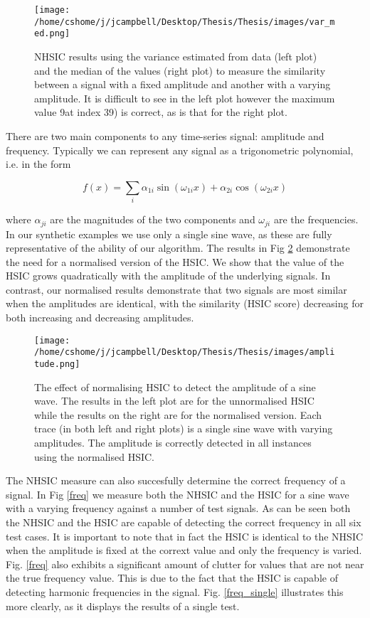 \begin{figure}[h]
\texttt{[image: /home/cshome/j/jcampbell/Desktop/Thesis/Thesis/images/var\_med.png]}
\caption{NHSIC results using the variance estimated from data (left plot) and the median of the values (right plot) to measure the similarity between a signal with a fixed amplitude and another with a varying amplitude. It is difficult to see in the left plot however the maximum value 9at index 39) is correct, as is that for the right plot.  \label{var_med}}
\end{figure}

There are two main components to any time-series signal: amplitude and frequency. Typically we can represent any signal as a trigonometric polynomial, i.e. in the form

\begin{equation}
f(x) = \sum_i{\alpha_{1i}\sin(\omega_{1i}x) + \alpha_{2i}\cos(\omega_{2i}x)}
\end{equation}

\noindent where $\alpha_{ji}$ are the magnitudes of the two components and $\omega_{ji}$ are the frequencies. In our synthetic examples we use only a single sine wave, as these are fully representative of the ability of our algorithm. The results in Fig \ref{amplitude} demonstrate the need for a normalised version of the HSIC. We show that the value of the HSIC grows quadratically with the amplitude of the underlying signals. In contrast, our normalised results demonstrate that two signals are most similar when the amplitudes are identical, with the similarity (HSIC score) decreasing for both increasing and decreasing amplitudes. \\

\begin{figure}[h!]
\texttt{[image: /home/cshome/j/jcampbell/Desktop/Thesis/Thesis/images/amplitude.png]}
\caption{The effect of normalising HSIC to detect the amplitude of a sine wave. The results in the left plot are for the unnormalised HSIC while the results on the right are for the normalised version. Each trace (in both left and right plots) is a single sine wave with varying amplitudes. The amplitude is correctly detected in all instances using the normalised HSIC.  \label{amplitude}}
\end{figure}

The NHSIC measure can also succesfully determine the correct frequency of a signal. In Fig \ref{freq} we measure both the NHSIC and the HSIC for a sine wave with a varying frequency against a number of test signals. As can be seen both the NHSIC and the HSIC are capable of detecting the correct frequency in all six test cases. It is important to note that in fact the HSIC is identical to the NHSIC when the amplitude is fixed at the corrext value and only the frequency is varied. Fig. \ref{freq} also exhibits a significant amount of clutter for values that are not near the true frequency value. This is due to the fact that the HSIC is capable of detecting harmonic frequencies in the signal. Fig. \ref{freq_single} illustrates this more clearly, as it displays the results of a single test. \\

